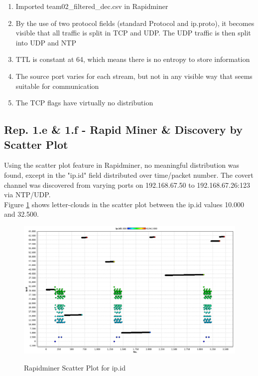 \documentclass{article}
\begin{document}
\begin{enumerate}
	\item Imported team02\_filtered\_dec.csv in Rapidminer
	\item By the use of two protocol fields (standard Protocol and ip.proto), it becomes visible that all traffic is split in TCP and UDP. The UDP traffic is then split into UDP and NTP
	\item TTL is constant at 64, which means there is no entropy to store information
	\item The source port varies for each stream, but not in any visible way that seems suitable for communication
	\item The TCP flags have virtually no distribution
\end{enumerate} 

\subsection*{Rep. 1.e \& 1.f - Rapid Miner \& Discovery by Scatter Plot}
Using the scatter plot feature in Rapidminer, no meaningful distribution was found, except in the "ip.id" field distributed over time/packet number. The covert channel was discovered from varying ports on 192.168.67.50 to 192.168.67.26:123 via NTP/UDP.\\

Figure \ref{fig:RMscreen} shows letter-clouds in the scatter plot between the ip.id values 10.000 and 32.500.
\begin{figure}[H] 
	\centering %
	{\includegraphics[width=\textwidth]{images/RMscreen.png}} %
	\caption{Rapidminer Scatter Plot for ip.id} 
	\label{fig:RMscreen} %
\end{figure} 
\end{document}
